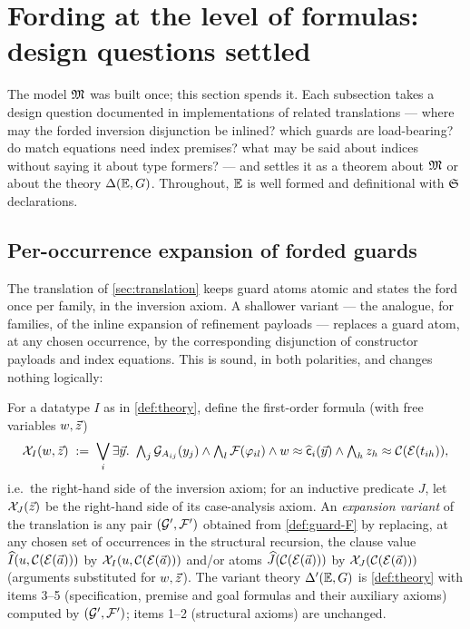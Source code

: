 \section{Fording at the level of formulas: design questions settled}
\label{sec:formulas}

The model $\mathfrak{M}$ was built once; this section spends it.  Each subsection
takes a design question documented in implementations of related
translations --- where may the forded inversion disjunction be inlined?
which guards are load-bearing?  do match equations need index premises?
what may be said about indices without saying it about type formers? ---
and settles it as a theorem about $\mathfrak{M}$ or about the theory $\Delta(\mathbb{E},G)$.
Throughout, $\mathbb{E}$ is well formed and definitional with $\mathfrak{S}$
declarations.

\subsection{Per-occurrence expansion of forded guards}
\label{sec:formulas-expansion}

The translation of \cref{sec:translation} keeps guard atoms atomic and
states the ford once per family, in the inversion axiom.  A shallower
variant --- the analogue, for families, of the inline expansion of
refinement payloads --- replaces a guard atom, at any chosen occurrence,
by the corresponding disjunction of constructor payloads and index
equations.  This is sound, in both polarities, and changes nothing
logically:

\begin{definition}
\label{def:expansion}
For a datatype $I$ as in \cref{def:theory}, define the first-order
formula (with free variables $w, \vec{z}$)
\[
  \mathcal{X}_{I}(w, \vec{z}) \;\mathrel{:=}\;
  \bigvee_i \exists \vec{y}.\
  \textstyle\bigwedge_j \mathcal{G}_{A_{ij}}(y_j) \wedge
  \bigwedge_l \mathcal{F}(\varphi_{il}) \wedge
  w \approx \widehat{\mathsf{c}}_i(\vec{y}) \wedge
  \textstyle\bigwedge_{h} z_h \approx \mathcal{C}(\mathcal{E}(t_{ih})),
\]
i.e.\ the right-hand side of the inversion axiom; for an inductive
predicate $J$, let $\mathcal{X}_{J}(\vec{z})$ be the right-hand side of its
case-analysis axiom.  An \emph{expansion variant} of the translation is
any pair $(\mathcal{G}', \mathcal{F}')$ obtained from \cref{def:guard-F} by
replacing, at any chosen set of occurrences in the structural recursion,
the clause value $\widehat{I}(u, \mathcal{C}(\mathcal{E}(\vec{a})))$ by
$\mathcal{X}_{I}(u, \mathcal{C}(\mathcal{E}(\vec{a})))$ and/or atoms
$\widehat{J}(\mathcal{C}(\mathcal{E}(\vec{a})))$ by
$\mathcal{X}_{J}(\mathcal{C}(\mathcal{E}(\vec{a})))$ (arguments substituted for $w,
\vec{z}$).  The variant theory $\Delta'(\mathbb{E}, G)$ is \cref{def:theory} with
items 3--5 (specification, premise and goal formulas and their auxiliary
axioms) computed by $(\mathcal{G}', \mathcal{F}')$; items 1--2 (structural axioms)
are unchanged.
\end{definition}

